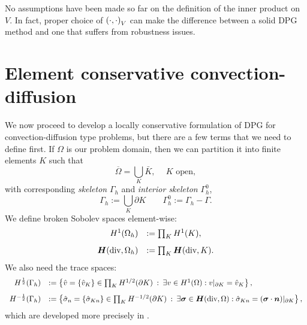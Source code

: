 \documentclass[Proposal.tex]{subfiles}
\begin{document}
No assumptions have been made so far on the definition of the inner product on
$V$. In fact, proper choice of $\left( \cdot,\cdot \right)_V$ can make the difference
between a solid DPG method and one that suffers from robustness issues.


\section{Element conservative convection-diffusion}
We now proceed to develop a locally conservative formulation of DPG for
convection-diffusion type problems, but there are a few terms that we need to
define first. If $\Omega$ is our problem domain, then we can partition it into
finite elements $K$ such that
\[
\overline{\Omega} = \bigcup_K  \bar{K},\: \quad K \text { open},
\]
with corresponding {\em skeleton} $\Gamma_h$ and {\em interior
  skeleton} $\Gamma_h^0$,
\[
\Gamma_h := \bigcup_K \partial K\qquad \Gamma_h^0 := \Gamma_h - \Gamma.
\]
We define broken Sobolev spaces element-wise:
\[
\begin{array}{rl}
H^1(\Omega_h) & := \prod_K H^1(K), \\[8pt]
\mbox{\boldmath $H$}(\text{div},\Omega_h) & := \prod_K \mbox{\boldmath $H$}(\text{div},K).
\end{array}
\]
We also need the trace spaces:
\[
\begin{array}{rl}
H^\frac{1}{2}(\Gamma_h) & := \left\{ \hat{v} = \{\hat{v}_K \} \in \prod_K H^{1/2}(\partial K) \: :
\: \exists v \in H^1(\Omega) : v|_{\partial K} = \hat{v}_K \right\}, \\[8pt]
H^{-\frac{1}{2}}(\Gamma_h) & := \left\{ {\hat{\sigma}}_n = \{ {\hat{\sigma}}_{Kn} \}\in \prod_K H^{-1/2}(\partial K) \: : \: \exists \boldsymbol\sigma \in \mbox{\boldmath $H$}(\text{div},\Omega)
: {\hat{\sigma}}_{Kn} = (\boldsymbol\sigma \cdot \boldsymbol n)|_{\partial K} \right\},
\end{array}
\]
which are developed more precisely in \cite{DPGStokes}.
\end{document}
